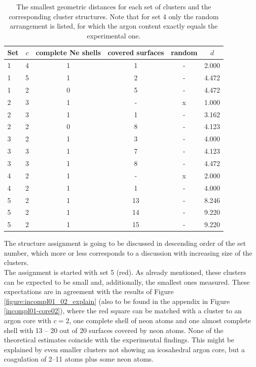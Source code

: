 \begin{table}[!h]
  \caption{The smallest geometric distances for each set of clusters
           and the corresponding cluster structures.
           Note that for set 4 only the random arrangement is listed,
           for which the argon content exactly equals the experimental one.}
  \centering
  \begin{tabular}{lccccc}
    \toprule
     Set  & $c$ & complete Ne shells & covered surfaces & random & $d$\\
    \midrule
      1   & 4   &          1         &        1         &   -    & 2.000\\
      1   & 5   &          1         &        2         &   -    & 4.472\\
      1   & 2   &          0         &        5         &   -    & 4.472\\
    \midrule
      2   & 3   &          1         &        -         &   x    & 1.000\\
      2   & 3   &          1         &        1         &   -    & 3.162\\
      2   & 2   &          0         &        8         &   -    & 4.123\\
    \midrule
      3   & 2   &          1         &        3         &   -    & 4.000\\
      3   & 3   &          1         &        7         &   -    & 4.123\\
      3   & 3   &          1         &        8         &   -    & 4.472\\
    \midrule
      4   & 2   &          1         &        -         &   x    & 2.000\\
      4   & 2   &          1         &        1         &   -    & 4.000\\
    \midrule
      5   & 2   &          1         &       13         &   -    & 8.246\\
      5   & 2   &          1         &       14         &   -    & 9.220\\
      5   & 2   &          1         &       15         &   -    & 9.220\\
    \bottomrule
  \end{tabular}
  \label{table:assignments}
\end{table}

The structure assignment is going to be discussed in descending order
of the set number, which more or less corresponds to a discussion with
increasing size of the clusters.\\
The assignment is started with set 5 (red). As already mentioned,
these clusters can be expected
to be small and, additionally, the smallest ones measured. These expectations are
in agreement with the results of Figure \ref{figure:incompl01_02_explain}
(also to be found in the
appendix in Figure \ref{incompl01-core02}), where the red square
can be matched with a cluster to an argon core with $c=2$, one complete
shell of neon atoms 
and one almost complete
shell with 13 -- 20 out of 20 surfaces covered by neon atoms. None of the
theoretical estimates coincide with the experimental findings. This might be
explained by even smaller clusters not showing an icosahedral argon core, but
a coagulation of 2--11 atoms plus some neon atoms.

